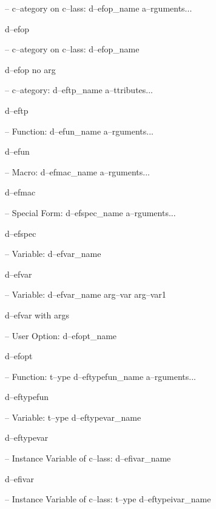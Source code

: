 \documentclass{book}
\begin{document}
\hbox{}-- c--ategory on c--lass: d--efop\_name a--rguments...


%
d--efop

\hbox{}-- c--ategory on c--lass: d--efop\_name


%
d--efop no arg

\hbox{}-- c--ategory: d--eftp\_name a--ttributes...


%
d--eftp

\hbox{}-- Function: d--efun\_name a--rguments...


%
d--efun

\hbox{}-- Macro: d--efmac\_name a--rguments...


%
d--efmac

\hbox{}-- Special Form: d--efspec\_name a--rguments...


%
d--efspec

\hbox{}-- Variable: d--efvar\_name


%
d--efvar

\hbox{}-- Variable: d--efvar\_name arg--var arg--var1


%
d--efvar with args

\hbox{}-- User Option: d--efopt\_name


%
d--efopt

\hbox{}-- Function: t--ype d--eftypefun\_name a--rguments...


%
d--eftypefun

\hbox{}-- Variable: t--ype d--eftypevar\_name


%
d--eftypevar

\hbox{}-- Instance Variable of c--lass: d--efivar\_name


%
d--efivar

\hbox{}-- Instance Variable of c--lass: t--ype d--eftypeivar\_name
\end{document}

